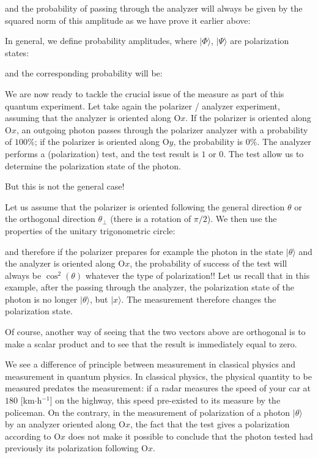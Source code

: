	and the probability of passing through the analyzer will always be given by the squared norm of this amplitude as we have prove it earlier above:
	
	In general, we define probability amplitudes, where $|\Phi\rangle$, $|\Psi\rangle$ are polarization states:
	
	and the corresponding probability will be:
	
	We are now ready to tackle the crucial issue of the measure as part of this quantum experiment. Let take again the polarizer / analyzer experiment, assuming that the analyzer is oriented along O$x$. If the polarizer is oriented along O$x$, an outgoing photon passes through the polarizer analyzer with a probability of $100\%$; if the polarizer is oriented along O$y$, the probability is $0\%$. The analyzer performs a (polarization) test, and the test result is $1$ or $0$. The test allow us to determine the polarization state of the photon.

	But this is not the general case!
	
	Let us assume that the polarizer is oriented following the general direction $\theta$ or the orthogonal direction $\theta_{\perp}$ (there is a rotation of $\pi/2$). We then use the properties of the unitary trigonometric circle:
	
	and therefore if the polarizer prepares for example the photon in the state $|\theta\rangle$ and the analyzer is oriented along O$x$, the probability of success of the test will always be $\cos^2(\theta)$ whatever the type of polarization!! Let us recall that in this example, after the passing through the analyzer, the polarization state of the photon is no longer $|\theta\rangle$, but $|x\rangle$. The measurement therefore changes the polarization state.
	
	\begin{tcolorbox}[title=Remark,colframe=black,arc=10pt]
	Of course, another way of seeing that the two vectors above are orthogonal is to make a scalar product and to see that the result is immediately equal to zero.
	\end{tcolorbox}
	We see a difference of principle between measurement in classical physics and measurement in quantum physics. In classical physics, the physical quantity to be measured predates the measurement: if a radar measures the speed of your car at $180$ [km$\cdot$h$^{-1}$] on the highway, this speed pre-existed to its measure by the policeman. On the contrary, in the measurement of polarization of a photon $|\theta\rangle$ by an analyzer oriented along O$x$, the fact that the test gives a polarization according to O$x$ does not make it possible to conclude that the photon tested had previously its polarization following O$x$.

